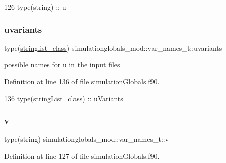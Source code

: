 \begin{DoxyCode}
126         \textcolor{keywordtype}{type}(string) :: u
\end{DoxyCode}
\mbox{\label{structsimulationglobals__mod_1_1var__names__t_a4a7350ba83ed451757bc06279a3ba337}} 
\subsubsection{\texorpdfstring{uvariants}{uvariants}}
{\footnotesize\ttfamily type(\mbox{\hyperlink{structsimulationglobals__mod_1_1stringlist__class}{stringlist\+\_\+class}}) simulationglobals\+\_\+mod\+::var\+\_\+names\+\_\+t\+::uvariants\hspace{0.3cm}{\ttfamily [private]}}



possible names for \textquotesingle{}u\textquotesingle{} in the input files 



Definition at line 136 of file simulation\+Globals.\+f90.


\begin{DoxyCode}
136         \textcolor{keywordtype}{type}(stringList\_class) :: uVariants
\end{DoxyCode}
\mbox{\label{structsimulationglobals__mod_1_1var__names__t_a037c76a1788e918a911686b1a357b63c}} 
\subsubsection{\texorpdfstring{v}{v}}
{\footnotesize\ttfamily type(string) simulationglobals\+\_\+mod\+::var\+\_\+names\+\_\+t\+::v\hspace{0.3cm}{\ttfamily [private]}}



Definition at line 127 of file simulation\+Globals.\+f90.


